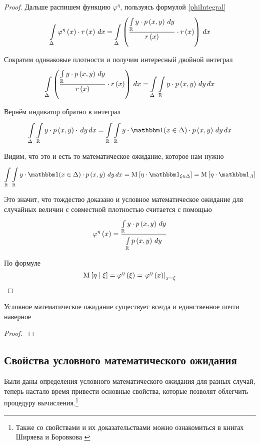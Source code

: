 \begin{proof}
Дальше распишем функцию $\varphi^{\eta}$,
пользуясь формулой \eqref{phiIntegral}
$$\integral{\Delta}{}{x}{
    \varphi^{\eta}\left( x \right) \cdot r\left( x \right)}
    = \integral{\Delta}{}{x}{\left(
        \frac{\integral{\mathbb{R}}{}{y}{y \cdot \pdf{x,y}}}
            {r\left( x \right)}
        \cdot r\left( x \right) \right)}$$

Сократим одинаковые плотности и получим интересный двойной интеграл
$$\integral{\Delta}{}{x}{\left(
        \frac{\integral{\mathbb{R}}{}{y}{y \cdot \pdf{x,y}}}
            {r\left( x \right)}
        \cdot r\left( x \right) \right)}
    = \integral{\Delta}{}{x}{
        \integral{\mathbb{R}}{}{y}{y \cdot \pdf{x,y}}}$$

Вернём индикатор обратно в интеграл
$$\integral{\Delta}{}{x}{
    \integral{\mathbb{R}}{}{y}{y \cdot \pdf{x,y} \cdot}}
    =\integral{\mathbb{R}}{}{x}{
        \integral{\mathbb{R}}{}{y}{y \cdot \indicator{x \in \Delta}
            \cdot \pdf{x,y}}}$$

Видим, что это и есть то математическое ожидание, которое нам нужно
$$\integral{\mathbb{R}}{}{x}{
    \integral{\mathbb{R}}{}{y}{y \cdot \indicator{x \in \Delta}
        \cdot \pdf{x,y}}}
    = \Mean{ \eta \cdot \indicatorof{\xi \in \Delta} }
    = \Mean{ \eta \cdot \indicatorof{A} }$$

Это значит, что тождество доказано и условное математическое ожидание
для случайных величин с совместной плотностью считается с помощью
$$\varphi^{\eta}\left( x \right)
    = \frac{\integral{\mathbb{R}}{}{y}{y \cdot \pdf{x,y}}}
                {\integral{\mathbb{R}}{}{y}{\pdf{x,y}}}$$

По формуле
$$\Mean{ \eta \mcond \xi }
    = \varphi^{\eta}\left( \xi \right)
    = \left. \varphi^{\eta}\left( x \right) \right|_{x=\xi}$$
\end{proof}

\begin{theorem}
    Условное математическое ожидание существует всегда
    и единственное почти наверное
\end{theorem}
\begin{proof}
\cite[стр.~142]{BorovkovMS}
\end{proof}

\subsection{Свойства условного математического ожидания}
Были даны определения условного математического ожидания для разных случай,
теперь настало время привести основные свойства,
которые позволят облегчить процедуру вычисления.\footnote{Также
со свойствами и их доказательствами можно ознакомиться в книгах
Ширяева \cite[стр.~270]{Shiryayev1} и Боровкова \cite[стр.~143]{BorovkovMS}
}

